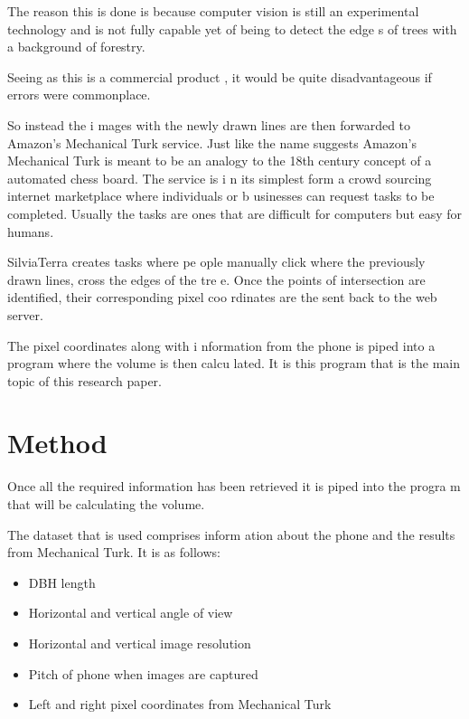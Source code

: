 The reason this is done is because computer vision is still an 
experimental technology and is not fully capable yet of being to detect the edge
s of trees with a background of forestry. 

Seeing as this is a commercial product
, it would be quite disadvantageous if errors were commonplace. 

So instead the i
mages with the newly drawn lines are then forwarded to Amazon's Mechanical Turk 
service. Just like the name suggests Amazon's Mechanical Turk is meant to be an 
analogy to the 18th century concept of a automated chess board. The service is i
n its simplest form a crowd sourcing internet marketplace where individuals or b
usinesses can request tasks to be completed. Usually the tasks are ones that are
 difficult for computers but easy for humans. 
 
 SilviaTerra creates tasks where pe
ople manually click where the previously drawn lines, cross the edges of the tre
e. Once the points of intersection are identified, their corresponding pixel coo
rdinates are the sent back to the web server. 

The pixel coordinates along with i
nformation from the phone is piped into a program where the volume is then calcu
lated. It is this program that is the main topic of this research paper.

\section{Method}
Once all the required information has been retrieved it is piped into the progra
m that will be calculating the volume. %

The dataset that is used comprises inform
ation about the phone and the results from Mechanical Turk. It is as follows:
\begin{itemize}
	\item DBH length
	\item Horizontal and vertical angle of view
	\item Horizontal and vertical image resolution
	\item Pitch of phone when images are captured
	\item Left and right pixel coordinates from Mechanical Turk
\end{itemize}

